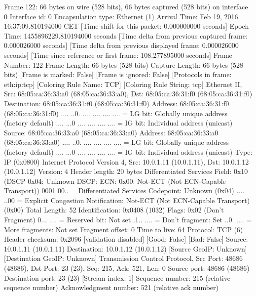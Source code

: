 Frame 122: 66 bytes on wire (528 bits), 66 bytes captured (528 bits) on interface 0
    Interface id: 0
    Encapsulation type: Ethernet (1)
    Arrival Time: Feb 19, 2016 16:37:09.810194000 CET
    [Time shift for this packet: 0.000000000 seconds]
    Epoch Time: 1455896229.810194000 seconds
    [Time delta from previous captured frame: 0.000026000 seconds]
    [Time delta from previous displayed frame: 0.000026000 seconds]
    [Time since reference or first frame: 108.277895000 seconds]
    Frame Number: 122
    Frame Length: 66 bytes (528 bits)
    Capture Length: 66 bytes (528 bits)
    [Frame is marked: False]
    [Frame is ignored: False]
    [Protocols in frame: eth:ip:tcp]
    [Coloring Rule Name: TCP]
    [Coloring Rule String: tcp]
Ethernet II, Src: 68:05:ca:36:33:a0 (68:05:ca:36:33:a0), Dst: 68:05:ca:36:31:f0 (68:05:ca:36:31:f0)
    Destination: 68:05:ca:36:31:f0 (68:05:ca:36:31:f0)
        Address: 68:05:ca:36:31:f0 (68:05:ca:36:31:f0)
        .... ..0. .... .... .... .... = LG bit: Globally unique address (factory default)
        .... ...0 .... .... .... .... = IG bit: Individual address (unicast)
    Source: 68:05:ca:36:33:a0 (68:05:ca:36:33:a0)
        Address: 68:05:ca:36:33:a0 (68:05:ca:36:33:a0)
        .... ..0. .... .... .... .... = LG bit: Globally unique address (factory default)
        .... ...0 .... .... .... .... = IG bit: Individual address (unicast)
    Type: IP (0x0800)
Internet Protocol Version 4, Src: 10.0.1.11 (10.0.1.11), Dst: 10.0.1.12 (10.0.1.12)
    Version: 4
    Header length: 20 bytes
    Differentiated Services Field: 0x10 (DSCP 0x04: Unknown DSCP; ECN: 0x00: Not-ECT (Not ECN-Capable Transport))
        0001 00.. = Differentiated Services Codepoint: Unknown (0x04)
        .... ..00 = Explicit Congestion Notification: Not-ECT (Not ECN-Capable Transport) (0x00)
    Total Length: 52
    Identification: 0x0408 (1032)
    Flags: 0x02 (Don't Fragment)
        0... .... = Reserved bit: Not set
        .1.. .... = Don't fragment: Set
        ..0. .... = More fragments: Not set
    Fragment offset: 0
    Time to live: 64
    Protocol: TCP (6)
    Header checksum: 0x2096 [validation disabled]
        [Good: False]
        [Bad: False]
    Source: 10.0.1.11 (10.0.1.11)
    Destination: 10.0.1.12 (10.0.1.12)
    [Source GeoIP: Unknown]
    [Destination GeoIP: Unknown]
Transmission Control Protocol, Src Port: 48686 (48686), Dst Port: 23 (23), Seq: 215, Ack: 521, Len: 0
    Source port: 48686 (48686)
    Destination port: 23 (23)
    [Stream index: 1]
    Sequence number: 215    (relative sequence number)
    Acknowledgment number: 521    (relative ack number)

